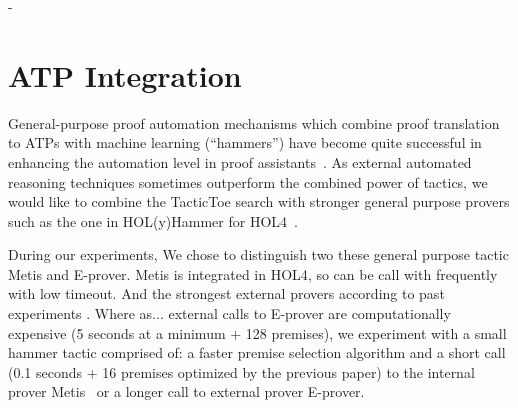 \documentclass[runningheads,a4paper,draft]{svjour3}
\def\holfour{\textsf{HOL4}\xspace}
\def\eprover{\textsf{E-prover}\xspace}
\def\holyhammer{\textsf{HOL(y)Hammer}\xspace}
\def\metis{\textsf{Metis}\xspace}
\def\tactictoe{\textsf{TacticToe}\xspace}
\begin{document}
%
%
%
%
%
%



%
- 

\section{ATP Integration}
General-purpose proof automation mechanisms which combine proof translation to
ATPs with machine learning (``hammers'') have become quite successful in
enhancing the automation level in proof assistants~\cite{hammers4qed}.
As external automated reasoning techniques sometimes outperform the combined 
power of tactics, we would like to combine the \tactictoe search with 
stronger general purpose provers such as the one in \holyhammer for 
\holfour~\cite{tgck-cpp15}. 

During our experiments,
We chose to distinguish two these general purpose tactic \metis and \eprover.
\metis is integrated in \holfour, so can be call with frequently with low 
timeout.
And the strongest external provers according to past experiments \cite{hh4h4}.
Where as...
external calls to \eprover are computationally expensive (5 seconds at a 
minimum +  128 premises), we  
experiment with a small hammer tactic comprised of: a faster premise 
selection algorithm and
a short call (0.1 seconds + 16 premises optimized by the previous paper) to the 
internal prover \metis~\cite{metis} or a
longer call to external prover \eprover. 
\end{document}

